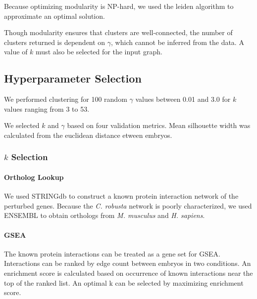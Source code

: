 \documentclass{article}
\begin{document}
Because optimizing modularity is NP-hard, we used the leiden algorithm to approximate an optimal solution\cite{traag2019louvain}.

Though modularity ensures that clusters are well-connected, the number of clusters returned is dependent on $\gamma$, which cannot be inferred from the data. A value of $k$ must also be selected for the input graph.

\subsection{Hyperparameter Selection}

We performed clustering for 100 random $\gamma$ values between 0.01 and 3.0 for $k$ values ranging from 3 to 53.

We selected $k$ and $\gamma$ based on four validation metrics. Mean silhouette width was calculated from the euclidean distance etween embryos.

\subsubsection{$k$ Selection}
\paragraph{Ortholog Lookup}
We used STRINGdb to construct a known protein interaction network of the perturbed genes\cite{10.1093/nar/gkq973}. Because the \textit{C. robusta} network is poorly characterized, we used ENSEMBL to obtain orthologs from \textit{M. musculus} and \textit{H. sapiens}. 

\paragraph{GSEA}
The known protein interactions can be treated as a gene set for GSEA\cite{subramanian2005gene}. Interactions can be ranked by edge count between embryos in two conditions. An enrichment score is calculated based on occurrence of known interactions near the top of the ranked list. An optimal k can be selected by maximizing enrichment score.
\end{document}
